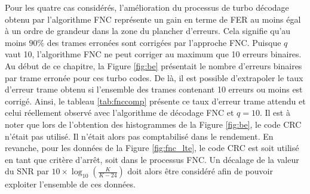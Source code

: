 Pour les quatre cas considérés, l'amélioration du processus de turbo décodage obtenu par l'algorithme FNC représente un
gain en terme de FER au moins égal à un ordre de grandeur dans la zone du plancher d'erreurs. Cela signifie qu'au moins 
$90\%$ des trames erronées sont corrigées par l'approche FNC. 
Puisque $q$ vaut 10, l'algorithme FNC ne peut corriger au maximum que 10 erreurs binaires. Au début de ce chapitre, la 
Figure \ref{fig:be} présentait le nombre d'erreurs binaires par trame erronée pour ces turbo codes. De là, il est possible 
d'extrapoler le taux d'erreur trame obtenu si l'ensemble des trames contenant 10 erreurs ou moins est corrigé. Ainsi, 
le tableau \ref{tab:fnccomp} présente ce taux d'erreur trame attendu et celui réellement observé avec l'algorithme de décodage
FNC et $q=10$. Il est à noter que lors de 
l'obtention des histogrammes de la Figure \ref{fig:be}, le code CRC n'était pas utilisé. Il n'était alors pas comptabilisé dans 
le rendement. En revanche, pour les données de la Figure \ref{fig:fnc_lte}, le code CRC est soit utilisé en tant que critère 
d'arrêt, soit dans le processus FNC. Un décalage de la valeur du SNR par $10\times \log_{10}\left(\frac{K}{K-24}\right)$
doit alors être considéré afin de pouvoir exploiter l'ensemble de ces données.

